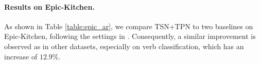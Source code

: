\documentclass[10pt,twocolumn,letterpaper]{article}
\begin{document}
\paragraph{Results on Epic-Kitchen.}
\begin{table}[t]
    \begin{center}
    \end{center}
    \caption{
    \textbf{Results on the validation set of Epic-Kitchen.}    
    TSN is equipped with TPN.}
    \label{table:epic_ar}
\end{table}

As shown in Table \ref{table:epic_ar}, we compare TSN+TPN to two baselines on Epic-Kitchen, following the settings in \cite{epic}.
Consequently, a similar improvement is observed as in other datasets, especially on verb classification, which has an increase of $12.9\%$.
\end{document}
